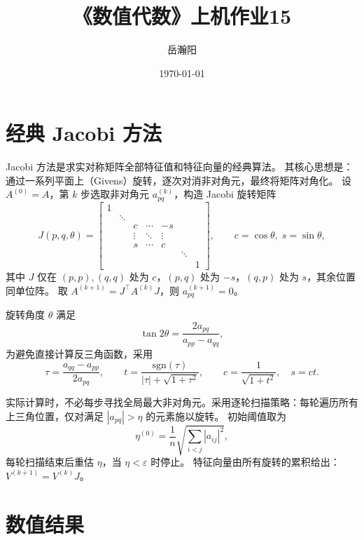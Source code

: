 \documentclass[10pt, a4paper]{article}
\title{\textbf{《数值代数》上机作业15}}
\author{岳瀚阳\quad\quad\quad\quad 3230104443}
\date{\today}
\begin{document}
\maketitle

\section{经典 Jacobi 方法}

Jacobi 方法是求实对称矩阵全部特征值和特征向量的经典算法。
其核心思想是：通过一系列平面上（Givens）旋转，逐次对消非对角元，最终将矩阵对角化。
设 $A^{(0)} = A$，第 $k$ 步选取非对角元 $a_{pq}^{(k)}$，构造 Jacobi 旋转矩阵
\[
J(p,q,\theta) = \begin{bmatrix}
1 & & & & & \\
& \ddots & & & & \\
& & c & \cdots & -s & \\
& & \vdots & \ddots & \vdots & \\
& & s & \cdots & c & \\
& & & & & \ddots & \\
& & & & & & 1
\end{bmatrix},
\qquad c = \cos\theta,\; s = \sin\theta,
\]
其中 $J$ 仅在 $(p,p), (q,q)$ 处为 $c$，$(p,q)$ 处为 $-s$，$(q,p)$ 处为 $s$，其余位置同单位阵。
取 $A^{(k+1)} = J^{\!\top} A^{(k)} J$，则 $a_{pq}^{(k+1)} = 0$。

旋转角度 $\theta$ 满足
\[
\tan 2\theta = \frac{2a_{pq}}{a_{pp} - a_{qq}},
\]
为避免直接计算反三角函数，采用
\[
\tau = \frac{a_{qq} - a_{pp}}{2a_{pq}}, \qquad
t = \frac{\mathrm{sgn}(\tau)}{|\tau| + \sqrt{1 + \tau^2}}, \qquad
c = \frac{1}{\sqrt{1 + t^2}}, \quad s = c t.
\]

实际计算时，不必每步寻找全局最大非对角元。采用逐轮扫描策略：每轮遍历所有上三角位置，仅对满足 $|a_{pq}| > \eta$ 的元素施以旋转。
初始阈值取为
\[
\eta^{(0)} = \frac{1}{n}\sqrt{\sum_{i<j} |a_{ij}|^2},
\]
每轮扫描结束后重估 $\eta$，当 $\eta < \varepsilon$ 时停止。
特征向量由所有旋转的累积给出：$V^{(k+1)} = V^{(k)} J$。

\section{数值结果}
\end{document}
